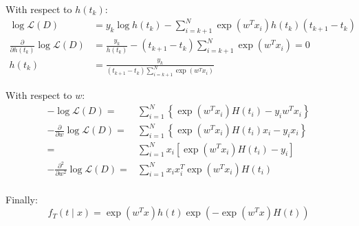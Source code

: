 \documentclass[]{article}
\begin{document}
With respect to $h(t_k)$:
\begin{equation*}
\begin{split}
\log\mathcal{L}(D)&=y_k\log h(t_k)-\sum_{i=k+1}^{N}\exp(w^Tx_i)h(t_k)(t_{k+1}-t_k)\\
\frac{\partial}{\partial h(t_k)}\log\mathcal{L}(D)&=\frac{y_k}{h(t_k)}-(t_{k+1}-t_k)\sum_{i=k+1}^{N}\exp(w^Tx_i)=0\\
h(t_k)&=\frac{y_k}{(t_{k+1}-t_k)\sum_{i=k+1}^{N}\exp(w^Tx_i)}
\end{split}
\end{equation*}

With respect to $w$:
\begin{equation*}
\begin{split}
-\log\mathcal{L}(D)
=&\sum_{i=1}^{N}\left\lbrace\exp(w^Tx_i)H(t_i)-y_iw^Tx_i\right\rbrace\\
-\frac{\partial}{\partial w}\log\mathcal{L}(D)=&\sum_{i=1}^{N}\left\lbrace\exp(w^Tx_i)H(t_i)x_i-y_ix_i\right\rbrace\\
=&\sum_{i=1}^{N}x_i\left[\exp(w^Tx_i)H(t_i)-y_i\right]\\
-\frac{\partial^2}{\partial w^2}\log\mathcal{L}(D)=&\sum_{i=1}^{N}x_ix_i^T\exp(w^Tx_i)H(t_i)\\
\end{split}
\end{equation*}

Finally:
\[f_T(t\mid x)=\exp(w^Tx)h(t)\exp(-\exp(w^Tx)H(t))\]
\end{document}
